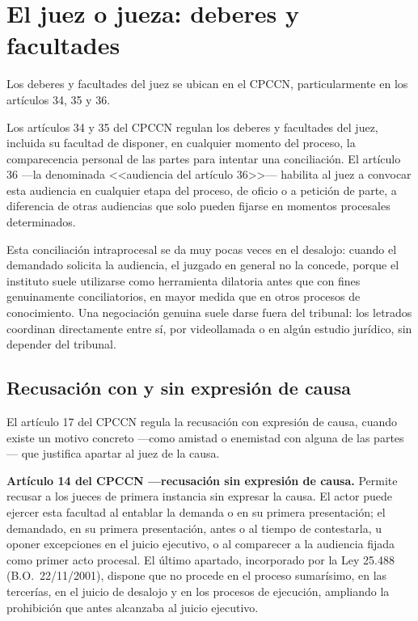 \documentclass[12pt,oneside]{book}
\begin{document}
\section{El juez o jueza: deberes y facultades}

Los deberes y facultades del juez se ubican en el CPCCN, particularmente en los artículos 34, 35 y 36.

\begin{important}
Los artículos 34 y 35 del CPCCN regulan los deberes y facultades del juez, incluida su facultad de disponer, en cualquier momento del proceso, la comparecencia personal de las partes para intentar una conciliación. El artículo 36 ---la denominada <<audiencia del artículo 36>>--- habilita al juez a convocar esta audiencia en cualquier etapa del proceso, de oficio o a petición de parte, a diferencia de otras audiencias que solo pueden fijarse en momentos procesales determinados.
\end{important}

Esta conciliación intraprocesal se da muy pocas veces en el desalojo: cuando el demandado solicita la audiencia, el juzgado en general no la concede, porque el instituto suele utilizarse como herramienta dilatoria antes que con fines genuinamente conciliatorios, en mayor medida que en otros procesos de conocimiento. Una negociación genuina suele darse fuera del tribunal: los letrados coordinan directamente entre sí, por videollamada o en algún estudio jurídico, sin depender del tribunal.

\subsection{Recusación con y sin expresión de causa}

\begin{note}
El artículo 17 del CPCCN regula la recusación con expresión de causa, cuando existe un motivo concreto ---como amistad o enemistad con alguna de las partes--- que justifica apartar al juez de la causa.
\end{note}

\begin{normacitada}
\textbf{Artículo 14 del CPCCN ---recusación sin expresión de causa.} Permite recusar a los jueces de primera instancia sin expresar la causa. El actor puede ejercer esta facultad al entablar la demanda o en su primera presentación; el demandado, en su primera presentación, antes o al tiempo de contestarla, u oponer excepciones en el juicio ejecutivo, o al comparecer a la audiencia fijada como primer acto procesal. El último apartado, incorporado por la Ley 25.488 (B.O.\ 22/11/2001), dispone que no procede en el proceso sumarísimo, en las tercerías, en el juicio de desalojo y en los procesos de ejecución, ampliando la prohibición que antes alcanzaba al juicio ejecutivo.
\end{normacitada}
\end{document}

